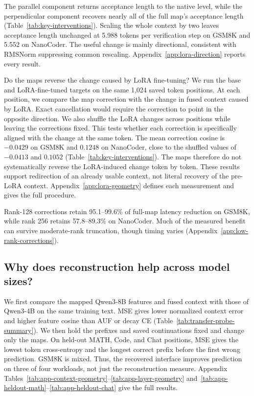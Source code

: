 The parallel component returns acceptance length to the native level, while the perpendicular component recovers nearly all of the full map's acceptance length (Table~\ref{tab:key-interventions}). Scaling the whole context by two leaves acceptance length unchanged at 5.988 tokens per verification step on GSM8K and 5.552 on NanoCoder. The useful change is mainly directional, consistent with RMSNorm suppressing common rescaling. Appendix~\ref{app:lora-direction} reports every result.

Do the maps reverse the change caused by LoRA fine-tuning? We run the base and LoRA-fine-tuned targets on the same 1,024 saved token positions. At each position, we compare the map correction with the change in fused context caused by LoRA. Exact cancellation would require the correction to point in the opposite direction. We also shuffle the LoRA changes across positions while leaving the corrections fixed. This tests whether each correction is specifically aligned with the change at the same token. The mean correction cosine is $-0.0429$ on GSM8K and $0.1248$ on NanoCoder, close to the shuffled values of $-0.0413$ and $0.1052$ (Table~\ref{tab:key-interventions}). The maps therefore do not systematically reverse the LoRA-induced change token by token. These results support redirection of an already usable context, not literal recovery of the pre-LoRA context. Appendix~\ref{app:lora-geometry} defines each measurement and gives the full procedure.

Rank-128 corrections retain 95.1--99.6\% of full-map latency reduction on GSM8K, while rank 256 retains 57.8--89.3\% on NanoCoder. Much of the measured benefit can survive moderate-rank truncation, though timing varies (Appendix~\ref{app:low-rank-corrections}).

\FloatBarrier
\subsection{Why does reconstruction help across model sizes?}
\label{sec:analysis-transfer}

We first compare the mapped Qwen3-8B features and fused context with those of Qwen3-4B on the same training text. MSE gives lower normalized context error and higher feature cosine than AUF or decay CE (Table~\ref{tab:transfer-probe-summary}). We then hold the prefixes and saved continuations fixed and change only the maps. On held-out MATH, Code, and Chat positions, MSE gives the lowest token cross-entropy and the longest correct prefix before the first wrong prediction. GSM8K is mixed. Thus, the recovered interface improves prediction on three of four workloads, not just the reconstruction measure. Appendix Tables~\ref{tab:app-context-geometry}--\ref{tab:app-layer-geometry} and~\ref{tab:app-heldout-math}--\ref{tab:app-heldout-chat} give the full results.

